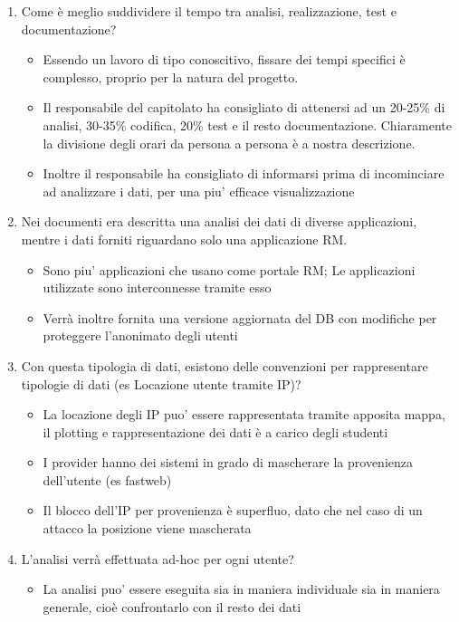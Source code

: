 \begin{enumerate}
	\item Come è meglio suddividere il tempo tra analisi, realizzazione, test e documentazione?
	\begin{itemize}
		\item Essendo un lavoro di tipo conoscitivo, fissare dei tempi specifici è complesso, proprio per la natura del progetto.
		\item Il responsabile del capitolato ha consigliato di attenersi ad un 20-25\% di analisi, 30-35\% codifica, 20\% test e il resto documentazione. Chiaramente la divisione degli orari da persona a persona è a nostra descrizione.
		\item Inoltre il responsabile ha consigliato di informarsi prima di incominciare ad analizzare i dati, per una piu' efficace visualizzazione
	\end{itemize}

	\item Nei documenti era descritta una analisi dei dati di diverse applicazioni, mentre i dati forniti riguardano solo una applicazione RM.
	\begin{itemize}
		\item Sono piu' applicazioni che usano come portale RM; Le applicazioni utilizzate sono interconnesse tramite esso
		\item Verrà inoltre fornita una versione aggiornata del DB con modifiche per proteggere l'anonimato degli utenti
	\end{itemize}

	\item Con questa tipologia di dati, esistono delle convenzioni per rappresentare tipologie di dati (es Locazione utente tramite IP)?
	\begin{itemize}
		\item La locazione degli IP puo' essere rappresentata tramite apposita mappa, il plotting e rappresentazione dei dati è a carico degli studenti
		\item I provider hanno dei sistemi in grado di mascherare la provenienza dell'utente (es fastweb)
		\item Il blocco dell'IP per provenienza è superfluo, dato che nel caso di un attacco la posizione viene mascherata
	\end{itemize}

	\item L'analisi verrà effettuata ad-hoc per ogni utente?
	\begin{itemize}
		\item La analisi puo' essere eseguita sia in maniera individuale sia in maniera generale, cioè confrontarlo con il resto dei dati
	\end{itemize}
\end{enumerate}

